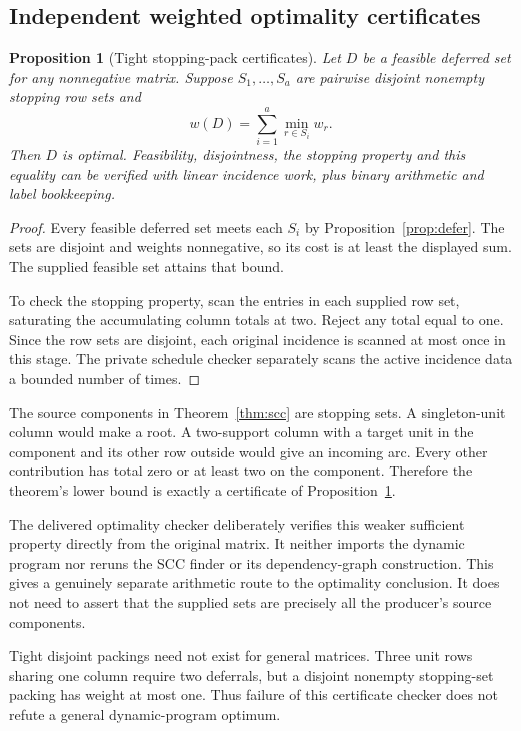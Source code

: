 \documentclass[11pt]{article}
\newtheorem{proposition}[theorem]{Proposition}
\theoremstyle{definition}\newtheorem{definition}[theorem]{Definition}
\theoremstyle{remark}\newtheorem{remark}[theorem]{Remark}
\begin{document}
\subsection{Independent weighted optimality certificates}
\begin{proposition}[Tight stopping-pack certificates]
\label{prop:packing}
Let $D$ be a feasible deferred set for any nonnegative matrix. Suppose $S_1,\ldots,S_a$ are pairwise disjoint nonempty stopping row sets and
\[
 w(D)=\sum_{i=1}^a\min_{r\in S_i}w_r.
\]
Then $D$ is optimal. Feasibility, disjointness, the stopping property and this equality can be verified with linear incidence work, plus binary arithmetic and label bookkeeping.
\end{proposition}
\begin{proof}
Every feasible deferred set meets each $S_i$ by Proposition~\ref{prop:defer}. The sets are disjoint and weights nonnegative, so its cost is at least the displayed sum. The supplied feasible set attains that bound.

To check the stopping property, scan the entries in each supplied row set, saturating the accumulating column totals at two. Reject any total equal to one. Since the row sets are disjoint, each original incidence is scanned at most once in this stage. The private schedule checker separately scans the active incidence data a bounded number of times.
\end{proof}

The source components in Theorem~\ref{thm:scc} are stopping sets. A singleton-unit column would make a root. A two-support column with a target unit in the component and its other row outside would give an incoming arc. Every other contribution has total zero or at least two on the component. Therefore the theorem's lower bound is exactly a certificate of Proposition~\ref{prop:packing}.

The delivered optimality checker deliberately verifies this weaker sufficient property directly from the original matrix. It neither imports the dynamic program nor reruns the SCC finder or its dependency-graph construction. This gives a genuinely separate arithmetic route to the optimality conclusion. It does not need to assert that the supplied sets are precisely all the producer's source components.

Tight disjoint packings need not exist for general matrices. Three unit rows sharing one column require two deferrals, but a disjoint nonempty stopping-set packing has weight at most one. Thus failure of this certificate checker does not refute a general dynamic-program optimum.
\end{document}
